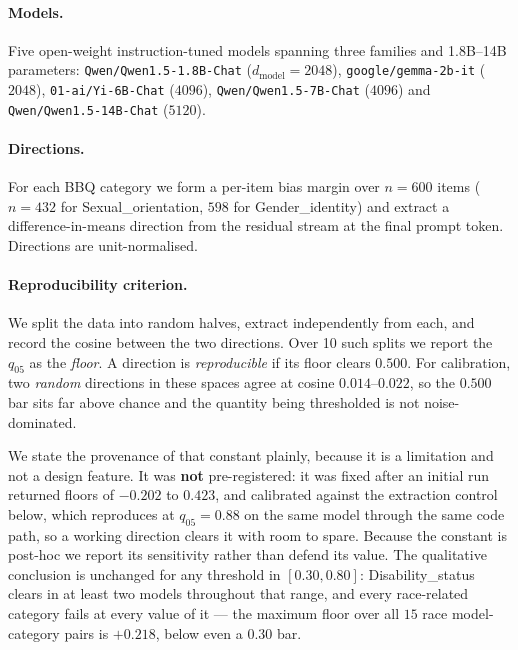 \documentclass{article}
\begin{document}
\paragraph{Models.} Five open-weight instruction-tuned models spanning three
families and 1.8B--14B parameters: \texttt{Qwen/Qwen1.5-1.8B-Chat}
($d_{\mathrm{model}}{=}2048$), \texttt{google/gemma-2b-it} ($2048$),
\texttt{01-ai/Yi-6B-Chat} ($4096$), \texttt{Qwen/Qwen1.5-7B-Chat} ($4096$) and
\texttt{Qwen/Qwen1.5-14B-Chat} ($5120$).

\paragraph{Directions.} For each BBQ category we form a per-item bias margin
over $n{=}600$ items ($n{=}432$ for Sexual\_orientation, $598$ for
Gender\_identity) and extract a difference-in-means direction from the residual
stream at the final prompt token. Directions are unit-normalised.

\paragraph{Reproducibility criterion.} We split the data into random halves,
extract independently from each, and record the cosine between the two
directions. Over 10 such splits we report the $q_{05}$ as the \emph{floor}. A
direction is \emph{reproducible} if its floor clears $0.500$. For calibration,
two \emph{random} directions in these spaces agree at cosine $0.014$--$0.022$,
so the $0.500$ bar sits far above chance and the quantity being thresholded is
not noise-dominated.

We state the provenance of that constant plainly, because it is a limitation and
not a design feature. It was \textbf{not} pre-registered: it was fixed after an
initial run returned floors of $-0.202$ to $0.423$, and calibrated against the
extraction control below, which reproduces at $q_{05}=0.88$ on the same model
through the same code path, so a working direction clears it with room to spare.
Because the constant is post-hoc we report its sensitivity rather than defend its
value. The qualitative conclusion is unchanged for any threshold in
$[0.30,0.80]$: Disability\_status clears in at least two models throughout that
range, and every race-related category fails at every value of it --- the maximum
floor over all $15$ race model-category pairs is $+0.218$, below even a $0.30$
bar.
\end{document}
